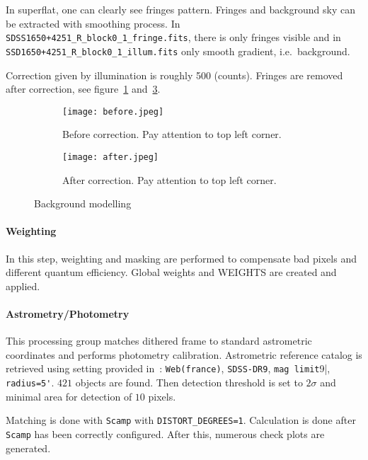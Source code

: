 In superflat, one can clearly see fringes pattern. Fringes and background sky can be extracted with smoothing process. In \verb|SDSS1650+4251_R_block0_1_fringe.fits|, there is only fringes visible and in \verb|SSD1650+4251_R_block0_1_illum.fits| only smooth gradient, i.e.~background.

Correction given by illumination is roughly \num{500} (counts). Fringes are removed after correction, see figure~\ref{fig:before} and~\ref{fig:after}.
\begin{figure}[H]
   \centering
   \begin{subfigure}[t]{0.7\textwidth}
   \begin{center}
   \texttt{[image: before.jpeg]}
   \end{center}
   \caption{Before correction. Pay attention to top left corner.}
   \label{fig:before}
   \end{subfigure}
   \begin{subfigure}[t]{0.7\textwidth}
   \begin{center}
   \texttt{[image: after.jpeg]}
   \end{center}
   \caption{After correction. Pay attention to top left corner.}
   \label{fig:after}
   \end{subfigure}
	\caption{Background modelling}
\end{figure}

\paragraph{Weighting} 
In this step, weighting and masking are performed to compensate bad pixels and different quantum efficiency. Global weights and WEIGHTS are created and applied.

\paragraph{Astrometry/Photometry}
This processing group matches dithered frame to standard astrometric coordinates and performs photometry calibration. Astrometric reference catalog is retrieved using setting provided in~\cite{manual}: \verb|Web(france)|, \verb|SDSS-DR9|, \verb|mag limit|9|, \verb|radius=5'|. $421$ objects are found. Then detection threshold is set to $2\sigma$ and minimal area for detection of $10$ pixels.

Matching is done with \verb|Scamp| with \verb|DISTORT_DEGREES=1|. Calculation is done after \verb|Scamp| has been correctly configured. After this, numerous check plots are generated.

